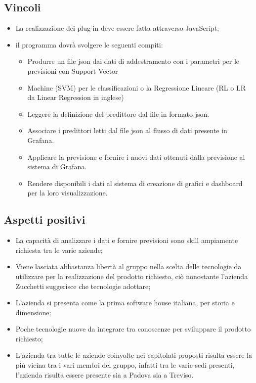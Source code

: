 \subsection{Vincoli}
\begin{itemize}
\item La realizzazione dei plug-in deve essere fatta attraverso JavaScript;
\item il programma dovr\`a svolgere le seguenti compiti:
\begin{itemize}
\item Produrre un file json dai dati di addestramento con i parametri per le previsioni con Support Vector \item Machine (SVM) per le classificazioni o la Regressione Lineare (RL o LR da Linear Regression in inglese)
\item Leggere la definizione del predittore dal file in formato json. 
\item Associare i predittori letti dal file json al flusso di dati presente in Grafana. 
\item Applicare la previsione e fornire i nuovi dati ottenuti dalla previsione al sistema di Grafana.
\item Rendere disponibili i dati al sistema di creazione di grafici e dashboard per la loro visualizzazione.
\end{itemize}
\end{itemize}

\subsection{Aspetti positivi}
\begin{itemize}
\item La capacit\`a di analizzare i dati e fornire previsioni sono skill ampiamente richiesta tra le varie aziende;
\item Viene lasciata abbastanza libert\`a al gruppo nella scelta delle tecnologie da utilizzare per la realizzazione del prodotto richiesto, ci\`o nonostante l'azienda Zucchetti suggerisce che tecnologie adottare;
\item L'azienda si presenta come la prima software house italiana, per storia e dimensione;
\item Poche tecnologie nuove da integrare tra conoscenze per sviluppare il prodotto richiesto;
\item L'azienda tra tutte le aziende coinvolte nei capitolati proposti risulta essere la pi\`u vicina tra i vari membri del gruppo, infatti tra le varie sedi presenti, l'azienda risulta essere presente sia a Padova sia a Treviso.

\end{itemize}

